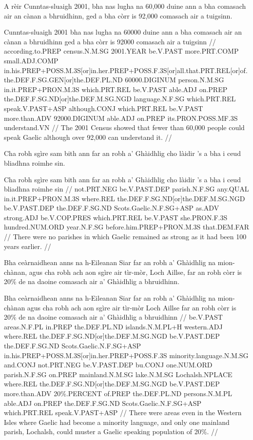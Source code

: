 \documentclass[a4paper,10pt]{article}
\begin{document}
\ex
\begingl
\glpre A rèir Cunntas-sluaigh 2001, bha nas lugha na 60,000 duine ann a bha comasach air an cànan a bhruidhinn, ged a bha còrr is 92,000 comasach air a tuigsinn. 

\vspace{4mm}
 Cunntas-sluaigh 2001 bha nas lugha na 60000 duine ann a bha comasach air an cànan a bhruidhinn ged a bha {còrr is} 92000 comasach air a tuigsinn  //
\glb according.to.PREP census.N.M.SG 2001.YEAR be.V.PAST more.PRT.COMP small.ADJ.COMP in.his.PREP+POSS.M.3S[or]in.her.PREP+POSS.F.3S[or]all.that.PRT.REL[or]of.the.DEF.F.SG.GEN[or]the.DEF.PL.ND 60000.DIGINUM person.N.M.SG in.it.PREP+PRON.M.3S which.PRT.REL be.V.PAST able.ADJ on.PREP the.DEF.F.SG.ND[or]the.DEF.M.SG.NGD language.N.F.SG which.PRT.REL speak.V.PAST+ASP although.CONJ which.PRT.REL be.V.PAST more.than.ADV 92000.DIGINUM able.ADJ on.PREP its.PRON.POSS.MF.3S understand.VN  //
\glft The 2001 Census showed that fewer than 60,000 people could speak Gaelic although over 92,000 can understand it. //
\endgl
\xe

\ex
\begingl
\glpre Cha robh sgìre sam bith ann far an robh a' Ghàidhlig cho làidir 's a bha i ceud bliadhna roimhe sin. 

\vspace{4mm}
\gla Cha robh sgìre {sam bith} ann far an robh a' Ghàidhlig cho làidir 's a bha i ceud bliadhna roimhe sin  //
\glb not.PRT.NEG be.V.PAST.DEP parish.N.F.SG any.QUAL in.it.PREP+PRON.M.3S where.REL the.DEF.F.SG.ND[or]the.DEF.M.SG.NGD be.V.PAST.DEP the.DEF.F.SG.ND Scots.Gaelic.N.F.SG+ASP as.ADV strong.ADJ be.V.COP.PRES which.PRT.REL be.V.PAST she.PRON.F.3S hundred.NUM.ORD year.N.F.SG before.him.PREP+PRON.M.3S that.DEM.FAR  //
\glft There were no parishes in which Gaelic remained as strong as it had been 100 years earlier. //
\endgl
\xe

\ex
\begingl
\glpre Bha ceàrnaidhean anns na h-Eileanan Siar far an robh a' Ghàidhlig na mion-chànan, agus cha robh ach aon sgìre air tìr-mòr, Loch Aillse, far an robh còrr is 20\% de na daoine comasach air a' Ghàidhlig a bhruidhinn. 

\vspace{4mm}
\gla Bha ceàrnaidhean anns na h-Eileanan Siar far an robh a' Ghàidhlig na mion-chànan agus cha robh ach aon sgìre air tìr-mòr Loch Aillse far an robh {còrr is} 20\% de na daoine comasach air a' Ghàidhlig a bhruidhinn  //
\glb be.V.PAST areas.N.F.PL in.PREP the.DEF.PL.ND islands.N.M.PL+H western.ADJ where.REL the.DEF.F.SG.ND[or]the.DEF.M.SG.NGD be.V.PAST.DEP the.DEF.F.SG.ND Scots.Gaelic.N.F.SG+ASP in.his.PREP+POSS.M.3S[or]in.her.PREP+POSS.F.3S minority.language.N.M.SG and.CONJ not.PRT.NEG be.V.PAST.DEP bu.CONJ one.NUM.ORD parish.N.F.SG on.PREP mainland.N.M.SG lake.N.M.SG Lochalsh.NPLACE where.REL the.DEF.F.SG.ND[or]the.DEF.M.SG.NGD be.V.PAST.DEP more.than.ADV 20\%.PERCENT of.PREP the.DEF.PL.ND persons.N.M.PL able.ADJ on.PREP the.DEF.F.SG.ND Scots.Gaelic.N.F.SG+ASP which.PRT.REL speak.V.PAST+ASP  //
\glft There were areas even in the Western Isles where Gaelic had become a minority language, and only one mainland parish, Lochalsh, could muster a Gaelic speaking population of 20\%. //
\endgl
\xe
\end{document}
